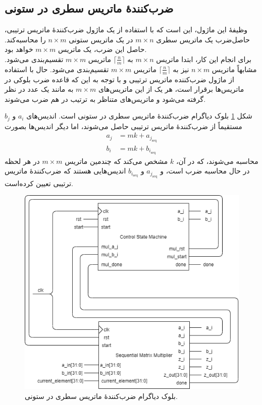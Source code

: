 \documentclass[conference]{IEEEtran-ModifiedForMVIP}
\begin{document}
\subsection{
    ضرب‌کنندهٔ ماتریس سطری در ستونی
}

وظیفهٔ این ماژول، این است که با استفاده از یک ماژول ضرب‌کنندهٔ ماتریس ترتیبی، حاصل‌ضرب یک ماتریس سطری
$m \times n$
در یک ماتریس ستونی
$n \times m$
را محاسبه‌کند.
حاصل این ضرب، یک ماتریس
$m \times m$
خواهد بود.
\\
برای انجام این‌ کار، ابتدا ماتریس 
$m \times n$
به 
${\lceil\frac{n}{m}\rceil}$
ماتریس 
$m \times m$
تقسیم‌بندی می‌شود.
مشابهاً ماتریس 
$n \times m$
نیز به 
$\lceil\frac{n}{m}\rceil$
ماتریس 
$m \times m$
تقسیم‌بندی می‌شود.
حال با استفاده از ماژول ضرب‌کننده ماتریس ترتیبی و با توجه به این که قاعده ضرب بلوکی در ماتریس‌ها برقرار است، هر یک از این ماتریس‌های 
$m \times m$
به مانند یک عدد در نظر گرفته می‌شود و ماتریس‌های متناظر به ترتیب در هم ضرب می‌شوند.

شکل
\ref{fig:RowColBD}
بلوک دیاگرام ضرب‌کنندهٔ ماتریس سطری در ستونی است.
اندیس‌های
$a_i$
و
$b_j$
مستقیماً از ضرب‌کنندهٔ ماتریس ترتیبی حاصل می‌شوند، اما دیگر اندیس‌ها بصورت
\begin{align*}
    a_j &= mk + a_{j_{\text{seq}}}\\
    b_i &= mk + b_{i_{\text{seq}}}
\end{align*}
محاسبه می‌شوند، که در آن،
$k$
مشخص می‌کند که چندمین ماتریس
$m \times m$
در هر لحظه در حال محاسبه ضرب است، و
$a_{j_{\text{seq}}}$
و
$b_{i_{\text{seq}}}$
اندیس‌هایی هستند که ضرب‌کنندهٔ ماتریس ترتیبی تعیین کرده‌است.

\begin{figure}[t]
\centering 
\includegraphics[width=1\linewidth]{Images/RowColBD.png}
\caption{
\centering
بلوک دیاگرام ضرب‌کنندهٔ ماتریس سطری در ستونی.
}\label{fig:RowColBD}
\end{figure}
\end{document}
